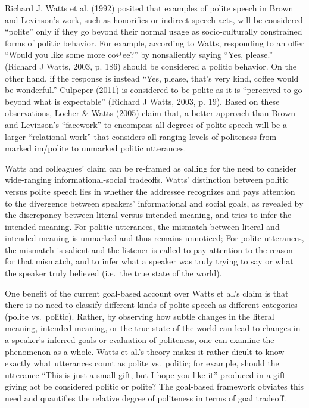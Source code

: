 \documentclass[oneside]{report}
\begin{document}
Richard J. Watts et al. (1992) posited that examples of polite speech in
Brown and Levinson's work, such as honorifics or indirect speech acts,
will be considered ``polite'' only if they go beyond their normal usage
as socio-culturally constrained forms of politic behavior. For example,
according to Watts, responding to an offer ``Would you like some more
co↵ee?'' by nonsaliently saying ``Yes, please.'' (Richard J Watts, 2003,
p. 186) should be considered a politic behavior. On the other hand, if
the response is instead ``Yes, please, that's very kind, coffee would be
wonderful.'' Culpeper (2011) is considered to be polite as it is
``perceived to go beyond what is expectable'' (Richard J Watts, 2003, p.
19). Based on these observations, Locher \& Watts (2005) claim that, a
better approach than Brown and Levinson's ``facework'' to encompass all
degrees of polite speech will be a larger ``relational work'' that
considers all-ranging levels of politeness from marked im/polite to
unmarked politic utterances.

Watts and colleagues' claim can be re-framed as calling for the need to
consider wide-ranging informational-social tradeoffs. Watts' distinction
between politic versus polite speech lies in whether the addressee
recognizes and pays attention to the divergence between speakers'
informational and social goals, as revealed by the discrepancy between
literal versus intended meaning, and tries to infer the intended
meaning. For politic utterances, the mismatch between literal and
intended meaning is unmarked and thus remains unnoticed; For polite
utterances, the mismatch is salient and the listener is called to pay
attention to the reason for that mismatch, and to infer what a speaker
was truly trying to say or what the speaker truly believed (i.e.~the
true state of the world).

One benefit of the current goal-based account over Watts et al.'s claim
is that there is no need to classify different kinds of polite speech as
different categories (polite vs.~politic). Rather, by observing how
subtle changes in the literal meaning, intended meaning, or the true
state of the world can lead to changes in a speaker's inferred goals or
evaluation of politeness, one can examine the phenomenon as a whole.
Watts et al.'s theory makes it rather dicult to know exactly what
utterances count as polite vs.~politic; for example, should the
utterance ``This is just a small gift, but I hope you like it'' produced
in a gift-giving act be considered politic or polite? The goal-based
framework obviates this need and quantifies the relative degree of
politeness in terms of goal tradeoff.
\end{document}
